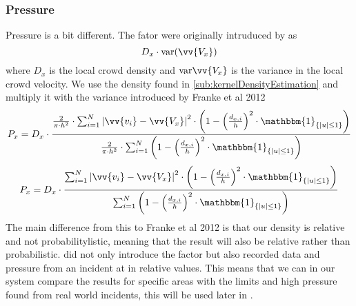 \subsubsection{Pressure}
Pressure is a bit different. The fator were originally intruduced by \citet{empircalstudy} as 
\begin{equation}
D_x \cdot \text{var}(\vv{V_x})
\end{equation}
where $D_x$ is the local crowd density and $\text{var}\vv{V_x}$ is the variance in the local crowd velocity. We use the density found in \cref{sub:kernelDensityEstimation} and multiply it with the variance introduced by Franke et al 2012 \cite{wirz2012inferring}
\begin{equation}
\label{eq:}
P_x = D_x \cdot \frac{\frac{2}{\pi \cdot h^2} \cdot \sum_{i=1}^{N} \left|\vv{v_i} - \vv{V_x}\right|^2 \cdot \left(1-\left(\frac{d_{x,i}}{h}\right)^2 \cdot \mathbbm{1}_{\{|u| \leq 1\} }\right)}{\frac{2}{\pi \cdot h^2} \cdot \sum_{i=1}^{N} \left(1-\left(\frac{d_{x,i}}{h}\right)^2 \cdot \mathbbm{1}_{\{|u| \leq 1\} }\right)}
\end{equation}
\begin{equation}
\label{eq:}
P_x = D_x \cdot \frac{\sum_{i=1}^{N} \left|\vv{v_i} - \vv{V_x}\right|^2 \cdot \left(1-\left(\frac{d_{x,i}}{h}\right)^2 \cdot \mathbbm{1}_{\{|u| \leq 1\} }\right)}{\sum_{i=1}^{N} \left(1-\left(\frac{d_{x,i}}{h}\right)^2 \cdot \mathbbm{1}_{\{|u| \leq 1\} }\right)}
\end{equation}
The main difference from this to Franke et al 2012 is that our density is relative and not probabilitylistic, meaning that the result will also be relative rather than probabilistic.  did not only introduce the factor but also recorded data and pressure from an incident at  in relative values. This means that we can in our system compare the results for specific areas with the limits and high pressure found from real world incidents, this will be used later in .